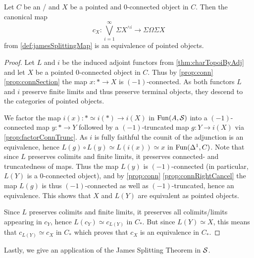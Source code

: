 \begin{corollary}\label{lem:genTopoiComparisonMapEq}
    Let $C$ be an \inftytop/ and $X$ be a pointed and $0$-connected object in $C$.
    Then the canonical map 
    \begin{equation*}
        c_X\colon\bigvee\limits_{i=1}^{\infty}\Sigma X^{\wedge i}\to\Sigma\Omega\Sigma X
    \end{equation*}
    from \cref{def:jamesSplittingMap} is an equivalence of pointed objects.
    \begin{proof}
        Let $L$ and $i$ be the induced adjoint functors from \cref{thm:charTopoiByAdj} and let $X$ be a pointed $0$-connected object in $C$.
        Thus by \cref{prop:conn} \ref{prop:connSection} the map $x\colon*\to X$ is $(-1)$-connected.
        As both functors $L$ and $i$ preserve finite limits and thus preserve terminal objects, they descend to the categories of pointed objects.

        We factor the map $i(x)\colon*\simeq i(*)\to i(X)$ in $\operatorname{Fun}(A,\mathcal{S})$ into a $(-1)$-connected map $y\colon*\to Y$ followed by a $(-1)$-truncated map $g\colon Y\to i(X)$ via \cref{prop:factorConnTrunc}.
        As $i$ is fully faithful the counit of the adjunction is an equivalence, hence $L(g)\circ L(y)\simeq L(i(x))\simeq x$ in $\operatorname{Fun}(\Delta^1,C)$.
        Note that since $L$ preserves colimits and finite limits, it preserves connected- and truncatedness of maps.
        Thus the map $L(y)$ is $(-1)$-connected (in particular, $L(Y)$ is a $0$-connected object), and by \cref{prop:conn} \ref{prop:connRightCancel} the map $L(g)$ is thus $(-1)$-connected as well as $(-1)$-truncated, hence an equivalence.
        This shows that $X$ and $L(Y)$ are equivalent as pointed objects.

        Since $L$ preserves colimits and finite limits, it preserves all colimits/limits appearing in $c_Y$, hence $L(c_Y)\simeq c_{L(Y)}$ in $C_*$.
        But since $L(Y)\simeq X$, this means that $c_{L(Y)}\simeq c_X$ in $C_*$ which proves that $c_X$ is an equivalence in $C_*$.
    \end{proof}
\end{corollary}
Lastly, we give an application of the James Splitting Theorem in $\mathcal{S}$.

